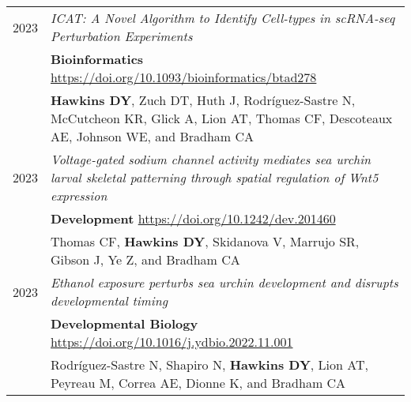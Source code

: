 \documentclass[a4paper,10pt]{report}
\begin{document}
\section{\color{linkcolour}{Recent Publications}}
\begin{tabular}{rp{11cm}}
	\textsc{2023} & \emph{ICAT: A Novel Algorithm to Identify Cell-types in scRNA-seq Perturbation Experiments}                                                                   \\
	              & \small \textbf{Bioinformatics} \href{https://doi.org/10.1093/bioinformatics/btad278}{https://doi.org/10.1093/bioinformatics/btad278}                          \\
	              & \footnotesize \textbf{Hawkins DY}, Zuch DT, Huth J, Rodríguez-Sastre N, McCutcheon KR, Glick A, Lion AT, Thomas CF, Descoteaux AE, Johnson WE, and Bradham CA \\
	\textsc{2023} & \emph{Voltage-gated sodium channel activity mediates sea urchin larval skeletal patterning through spatial regulation of Wnt5 expression}                     \\
	              & \small \textbf{Development} \href{https://doi.org/10.1242/dev.201460}{https://doi.org/10.1242/dev.201460}                                                     \\
	              & \footnotesize Thomas CF, \textbf{Hawkins DY}, Skidanova V, Marrujo SR, Gibson J, Ye Z, and Bradham CA                                                         \\
	\textsc{2023} & \emph{Ethanol exposure perturbs sea urchin development and disrupts developmental timing}                                                                     \\
	              & \small \textbf{Developmental Biology} \href{https://doi.org/10.1016/j.ydbio.2022.11.001}{https://doi.org/10.1016/j.ydbio.2022.11.001}                         \\
	              & \footnotesize Rodríguez-Sastre N, Shapiro N, \textbf{Hawkins DY}, Lion AT, Peyreau M, Correa AE, Dionne K, and Bradham CA                                     \\
\end{tabular}

\end{document}
